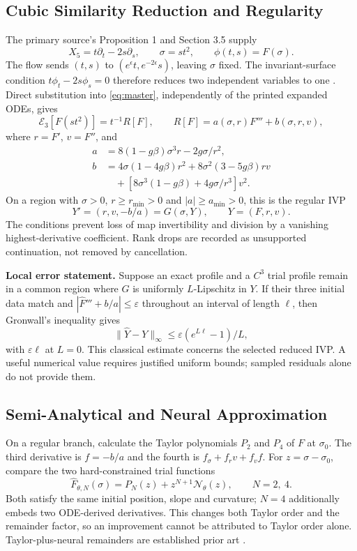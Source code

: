 \documentclass[12pt,a4paper]{article}
\begin{document}
\subsection{Cubic Similarity Reduction and Regularity}
The primary source's Proposition 1 and Section 3.5 supply
\[
X_5=t\partial_t-2s\partial_s,\qquad
\sigma=st^2,\qquad \phi(t,s)=F(\sigma).
\]
The flow sends $(t,s)$ to $(e^\epsilon t,e^{-2\epsilon}s)$, leaving $\sigma$ fixed. The invariant-surface condition $t\phi_t-2s\phi_s=0$ therefore reduces two independent variables to one \cite{olver}. Direct substitution into \eqref{eq:master}, independently of the printed expanded ODEs, gives
\begin{equation}
\mathcal E_3[F(st^2)]=t^{-1}R[F],\qquad
R[F]=a(\sigma,r)F'''+b(\sigma,r,v),
\label{eq:lift}
\end{equation}
where $r=F'$, $v=F''$, and
\[
\begin{aligned}
a&=8(1-g\beta)\sigma^3r-2g\sigma/r^2,\\
b&=4\sigma(1-4g\beta)r^2+8\sigma^2(3-5g\beta)rv\\
 &\quad+\left[8\sigma^3(1-g\beta)+4g\sigma/r^3\right]v^2.
\end{aligned}
\]
On a region with $\sigma>0$, $r\ge r_{\min}>0$ and $|a|\ge a_{\min}>0$, this is the regular IVP
\[
Y'=(r,v,-b/a)=G(\sigma,Y),\qquad Y=(F,r,v).
\]
The conditions prevent loss of map invertibility and division by a vanishing highest-derivative coefficient. Rank drops are recorded as unsupported continuation, not removed by cancellation.

\textbf{Local error statement.} Suppose an exact profile and a $C^3$ trial profile remain in a common region where $G$ is uniformly $L$-Lipschitz in $Y$. If their three initial data match and $|\widehat F'''+b/a|\le\varepsilon$ throughout an interval of length $\ell$, then Gronwall's inequality gives
\[
\|\widehat Y-Y\|_\infty\le\varepsilon(e^{L\ell}-1)/L,
\]
with $\varepsilon\ell$ at $L=0$. This classical estimate concerns the selected reduced IVP. A useful numerical value requires justified uniform bounds; sampled residuals alone do not provide them.

\newpage
\subsection{Semi-Analytical and Neural Approximation}
On a regular branch, calculate the Taylor polynomials $P_2$ and $P_4$ of $F$ at $\sigma_0$. The third derivative is $f=-b/a$ and the fourth is $f_\sigma+f_rv+f_vf$. For $z=\sigma-\sigma_0$, compare the two hard-constrained trial functions
\[
\widehat F_{\theta,N}(\sigma)=P_N(z)+z^{N+1}\mathcal N_\theta(z),
\qquad N=2,\ 4.
\]
Both satisfy the same initial position, slope and curvature; $N=4$ additionally embeds two ODE-derived derivatives. This changes both Taylor order and the remainder factor, so an improvement cannot be attributed to Taylor order alone. Taylor-plus-neural remainders are established prior art \cite{taylor}.
\end{document}
